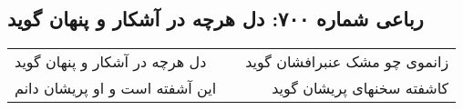 \begin{center}
\section*{رباعی شماره ۷۰۰: دل هرچه در آشکار و پنهان گوید}
\label{sec:0700}
\begin{longtable}{l p{0.5cm} r}
دل هرچه در آشکار و پنهان گوید
&&
زانموی چو مشک عنبرافشان گوید
\\
این آشفته است و او پریشان دانم
&&
کاشفته سخنهای پریشان گوید
\\
\end{longtable}
\end{center}
